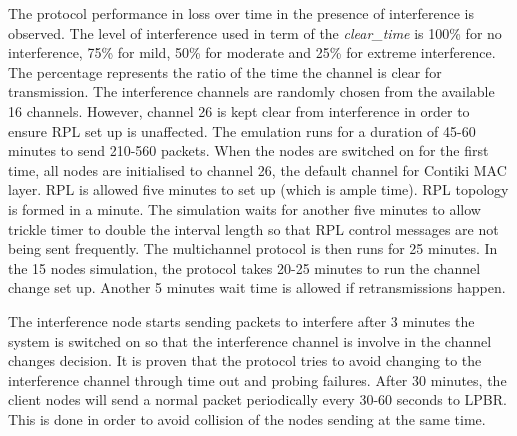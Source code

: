 The protocol performance in loss over time in the presence of interference is observed. The level of interference used in term of the \textit{clear\_time} is 100\% for no interference, 75\% for mild, 50\% for moderate and 25\% for extreme interference. The percentage represents the ratio of the time the channel is clear for transmission.
The interference channels are randomly chosen from the available 16 channels.
However, channel 26 is kept clear from interference in order to ensure RPL set up is unaffected. 
The emulation runs for a duration of 45-60 minutes to send 210-560 packets. When the nodes are switched on for the first time, all nodes are initialised to channel 26, the default channel for Contiki MAC layer. RPL is allowed five minutes to set up (which is ample time). RPL topology is formed in a minute. The simulation waits for another five minutes to allow trickle timer to double the interval length so that RPL control messages are not being sent frequently. The multichannel protocol is then runs for 25 minutes. In the 15 nodes simulation, the protocol takes 20-25 minutes to run the channel change set up. Another 5 minutes wait time is allowed if retransmissions happen. 

The interference node starts sending packets to interfere after 3 minutes the system is switched on so that the interference channel is involve in the channel changes decision. It is proven that the protocol tries to avoid changing to the interference channel through time out and probing failures. After 30 minutes, the client nodes will send a normal packet periodically every 30-60 seconds to LPBR. This is done in order to avoid collision of the nodes sending at the same time. 

